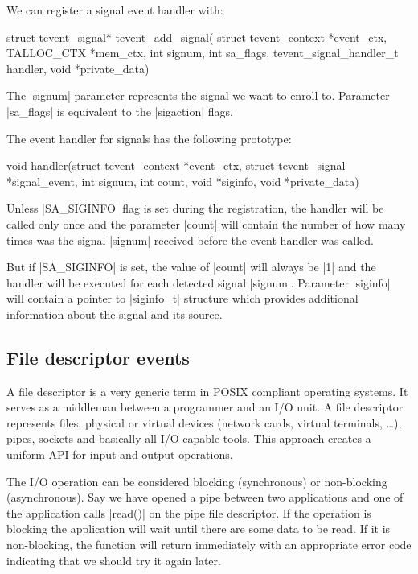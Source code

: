 \noindent
We can register a signal event handler with:

\begin{funcproto}
struct tevent_signal* tevent_add_signal(
             struct tevent_context *event_ctx,
             TALLOC_CTX *mem_ctx,
             int signum, int sa_flags,
             tevent_signal_handler_t handler,
             void *private_data)   
\end{funcproto}
\begin{funcdesc}
The |signum| parameter represents the signal we want to enroll to.
Parameter |sa_flags| is equivalent to the |sigaction| flags.
\end{funcdesc}
\funclistend
The event handler for signals has the following prototype:

\begin{funcproto}
void handler(struct tevent_context *event_ctx,
             struct tevent_signal *signal_event,
             int signum, int count, void *siginfo,
             void *private_data)
\end{funcproto}
\funclistend
Unless |SA_SIGINFO| flag is set during the registration, the handler will be
called only once and the parameter |count| will contain the number of how many
times was the signal |signum| received before the event handler was called.

But if |SA_SIGINFO| is set, the value of |count| will always be |1| and the
handler will be executed for each detected signal |signum|. Parameter |siginfo|
will contain a pointer to |siginfo_t| structure which provides additional
information about the signal and its source.

\subsection{File descriptor events}

A file descriptor is a very generic term in POSIX compliant operating
systems. It serves as a middleman between a programmer and an I/O unit. A file
descriptor represents files, physical or virtual devices (network cards, virtual
terminals, \ldots), pipes, sockets and basically all I/O capable tools. This
approach creates a uniform API for input and output operations.

The I/O operation can be considered blocking (synchronous) or non-blocking
(asynchronous). Say we have opened a pipe between two applications and one of
the application calls |read()| on the pipe file descriptor. If the operation is
blocking the application will wait until there are some data to be read. If it
is non-blocking, the function will return immediately with an appropriate error
code indicating that we should try it again later.

